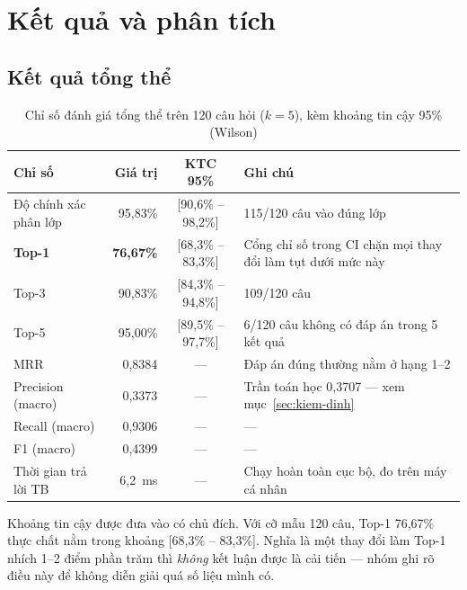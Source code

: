 \section{Kết quả và phân tích}
\label{sec:ket-qua}

\subsection{Kết quả tổng thể}

\begin{table}[H]
\centering
\caption{Chỉ số đánh giá tổng thể trên 120 câu hỏi ($k = 5$), kèm khoảng tin cậy 95\% (Wilson)}
\label{tab:tong-the}
\renewcommand{\arraystretch}{1.2}
\begin{tabularx}{\textwidth}{@{}l r c L@{}}
\toprule
\textbf{Chỉ số} & \textbf{Giá trị} & \textbf{KTC 95\%} & \textbf{Ghi chú} \\
\midrule
Độ chính xác phân lớp & 95,83\% & [90,6\% -- 98,2\%] & 115/120 câu vào đúng lớp \\
\textbf{Top-1}        & \textbf{76,67\%} & [68,3\% -- 83,3\%] & Cổng chỉ số trong CI chặn mọi thay đổi làm tụt dưới mức này \\
Top-3                 & 90,83\% & [84,3\% -- 94,8\%] & 109/120 câu \\
Top-5                 & 95,00\% & [89,5\% -- 97,7\%] & 6/120 câu không có đáp án trong 5 kết quả \\
MRR                   & 0,8384  & ---                & Đáp án đúng thường nằm ở hạng 1--2 \\
Precision (macro)     & 0,3373  & ---                & Trần toán học 0,3707 --- xem mục~\ref{sec:kiem-dinh} \\
Recall (macro)        & 0,9306  & ---                & --- \\
F1 (macro)            & 0,4399  & ---                & --- \\
Thời gian trả lời TB  & 6,2~ms  & ---                & Chạy hoàn toàn cục bộ, đo trên máy cá nhân \\
\bottomrule
\end{tabularx}
\end{table}

Khoảng tin cậy được đưa vào có chủ đích. Với cỡ mẫu 120 câu, Top-1 76,67\% thực chất nằm
trong khoảng [68,3\% -- 83,3\%]. Nghĩa là một thay đổi làm Top-1 nhích 1--2 điểm phần trăm thì
\emph{không} kết luận được là cải tiến --- nhóm ghi rõ điều này để không diễn giải quá số liệu
mình có.

